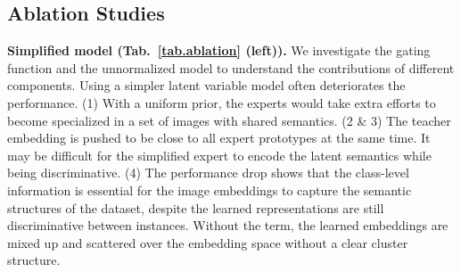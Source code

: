 \documentclass{article} \usepackage{iclr2021_conference,times}
\begin{document}
\subsection{Ablation Studies}
{\bf Simplified model (Tab.~\ref{tab.ablation} (left)).} We investigate the gating function and the unnormalized model to understand the contributions of different components. Using a simpler latent variable model often deteriorates the performance.  (1) With a uniform prior, the experts would take extra efforts to become specialized in a set of images with shared semantics. 
(2 \& 3) The teacher embedding  is pushed to be close to all expert prototypes at the same time. It may be difficult for the simplified expert to encode the latent semantics while being discriminative. (4) The performance drop shows that the class-level information is essential for the image embeddings to capture the semantic structures of the dataset, despite the learned representations are still discriminative between instances. Without the term, the learned embeddings are mixed up and scattered over the embedding space without a clear cluster structure.
\end{document}
